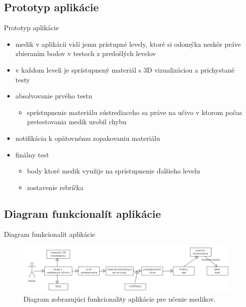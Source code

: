 \documentclass[10pt]{beamer}
\begin{document}
\subsection{Prototyp aplikácie}\label{gamifikacia:aplikacia}
    \begin{frame}{Prototyp aplikácie}
      \begin{itemize}
  \setlength\itemsep{2em}
\item medik v aplikácii vidí jemu prístupné levely, ktoré si odomýka neskôr práve zbieraním bodov v testoch z predošlých levelov
	
\item v každom leveli je sprístupnený materiál s 3D vizualizáciou a prichystané testy
	
\item absolvovanie prvého testu
	\begin{itemize}
	\item sprístupnenie materiálu sústrediaceho sa práve na učivo v ktorom počas pretestovania medik urobil chybu
	\end{itemize}
	
\item notifikácia k opätovnému zopakovaniu materiálu

\item finálny test
	\begin{itemize}
	\item body ktoré medik využije na sprístupnenie ďalšieho levelu
	\item zostavenie rebríčka
	\end{itemize}

\end{itemize}
\end{frame}

\subsection{Diagram funkcionalít aplikácie}\label{gamifikacia:diagram}
 \begin{frame}{Diagram funkcionalít aplikácie}
     
\begin{figure}[tbh]
\centering
\includegraphics[scale=0.35]{dia.png}
\caption{Diagram zobrazujúci funkcionality aplikácie pre učenie medikov.}
\label{diagram}
\end{figure}

\end{frame}
    
\end{document}
